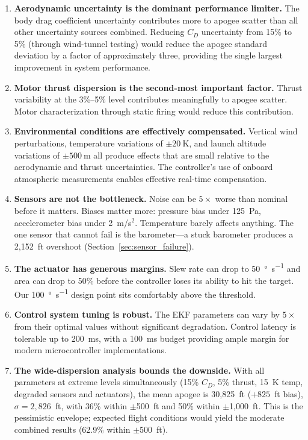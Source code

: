 \documentclass[11pt,letterpaper]{article}
\newcommand{\Cd}{C_D}
\begin{document}
\begin{enumerate}[nosep]
    \item \textbf{Aerodynamic uncertainty is the dominant performance limiter.} The body drag coefficient uncertainty contributes more to apogee scatter than all other uncertainty sources combined. Reducing $\Cd$ uncertainty from 15\% to 5\% (through wind-tunnel testing) would reduce the apogee standard deviation by a factor of approximately three, providing the single largest improvement in system performance.

    \item \textbf{Motor thrust dispersion is the second-most important factor.} Thrust variability at the 3\%--5\% level contributes meaningfully to apogee scatter. Motor characterization through static firing would reduce this contribution.

    \item \textbf{Environmental conditions are effectively compensated.} Vertical wind perturbations, temperature variations of $\pm\SI{20}{\kelvin}$, and launch altitude variations of $\pm\SI{500}{\metre}$ all produce effects that are small relative to the aerodynamic and thrust uncertainties. The controller's use of onboard atmospheric measurements enables effective real-time compensation.

    \item \textbf{Sensors are not the bottleneck.} Noise can be $5\times$ worse than nominal before it matters. Biases matter more: pressure bias under 125~Pa, accelerometer bias under 2~m/s$^2$. Temperature barely affects anything. The one sensor that cannot fail is the barometer---a stuck barometer produces a 2{,}152~ft overshoot (Section~\ref{sec:sensor_failure}).

    \item \textbf{The actuator has generous margins.} Slew rate can drop to \SI{50}{\degree\per\second} and area can drop to 50\% before the controller loses its ability to hit the target. Our \SI{100}{\degree\per\second} design point sits comfortably above the threshold.

    \item \textbf{Control system tuning is robust.} The EKF parameters can vary by $5\times$ from their optimal values without significant degradation. Control latency is tolerable up to \SI{200}{\milli\second}, with a \SI{100}{\milli\second} budget providing ample margin for modern microcontroller implementations.

    \item \textbf{The wide-dispersion analysis bounds the downside.} With all parameters at extreme levels simultaneously (15\% $\Cd$, 5\% thrust, 15~K temp, degraded sensors and actuators), the mean apogee is 30{,}825~ft ($+825$~ft bias), $\sigma = 2{,}826$~ft, with 36\% within $\pm$500~ft and 50\% within $\pm$1{,}000~ft. This is the pessimistic envelope; expected flight conditions would yield the moderate combined results (62.9\% within $\pm$500~ft).
\end{enumerate}
\end{document}

